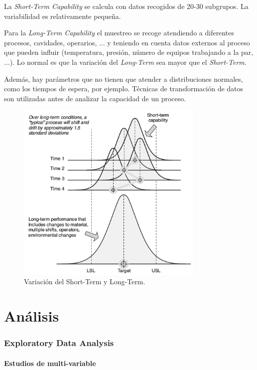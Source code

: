 \documentclass[]{article}
\begin{document}
La \textit{Short-Term Capability} se calcula con datos recogidos de 20-30 subgrupos. La variabilidad es relativamente pequeña.

Para la \textit{Long-Term Capability} el muestreo se recoge atendiendo a diferentes procesos, cavidades, operarios, ... y teniendo en cuenta datos externos al proceso que pueden influir (temperatura, presión, número de equipos trabajando a la par, ...). Lo normal es que la variación del \textit{Long-Term} sea mayor que el \textit{Short-Term}.

Además, hay parámetros que no tienen que atender a distribuciones normales, como los tiempos de espera, por ejemplo. Técnicas de transformación de datos son utilizadas antes de analizar la capacidad de un proceso.

\begin{figure}[H]
	\centering
	\includegraphics[width=90mm]{imagenes/ShortTermVsLongTerm.png}
	\caption{Variación del Short-Term y Long-Term.}
	\label{fig:ShortTermVsLongTerm}
\end{figure}

\pagebreak[4]
\part{Análisis}

\section{Exploratory Data Analysis}

\subsection{Estudios de multi-variable}
\end{document}
